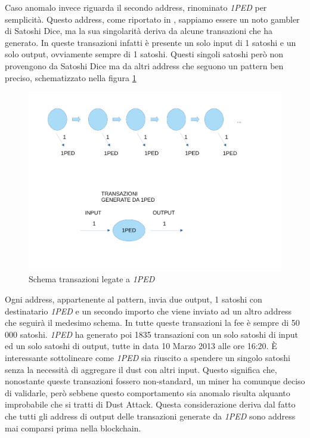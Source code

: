 Caso anomalo invece riguarda il secondo address, rinominato \textit{1PED} per semplicità. Questo address, come riportato in \cite{dustAnalisi}, sappiamo essere un noto gambler di Satoshi Dice, ma la sua singolarità deriva da alcune transazioni che ha generato. In queste transazioni infatti è presente un solo input di 1 satoshi e un solo output, ovviamente sempre di 1 satoshi. Questi singoli satoshi però non provengono da Satoshi Dice ma da altri address che seguono un pattern ben preciso, schematizzato nella figura \ref{fig:1PED}
\begin{figure}[h!]
    \centering
    \includegraphics[scale=0.4]{Images/1Ped.pdf}
    \caption{Schema transazioni legate a \textit{1PED}}
    \label{fig:1PED}
\end{figure}
\FloatBarrier
Ogni address, appartenente al pattern, invia due output, 1 satoshi con destinatario \textit{1PED} e un secondo importo che viene inviato ad un altro address che seguirà il medesimo schema. In tutte queste transazioni la fee è sempre di 50 000 satoshi. \textit{1PED} ha generato poi 1835 transazioni con un solo satoshi di input ed un solo satoshi di output, tutte in data 10 Marzo 2013 alle ore 16:20. È interessante sottolineare come \textit{1PED} sia riuscito a spendere un singolo satoshi senza la necessità di aggregare il dust con altri input. Questo significa che, nonostante queste transazioni fossero non-standard, un miner ha comunque deciso di validarle, però sebbene questo comportamento sia anomalo risulta alquanto improbabile che si tratti di Dust Attack. Questa considerazione deriva dal fatto che tutti gli address di output delle transazioni generate da \textit{1PED} sono address mai comparsi prima nella blockchain.

